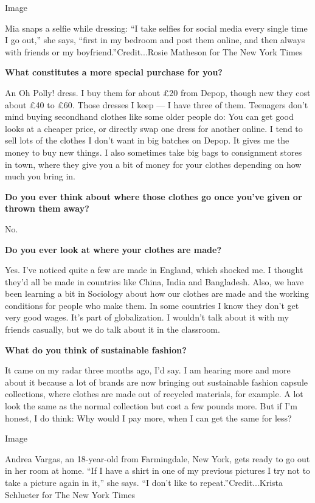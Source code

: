 Image

Mia snaps a selfie while dressing: ``I take selfies for social media
every single time I go out,'' she says, ``first in my bedroom and post
them online, and then always with friends or my
boyfriend.''Credit...Rosie Matheson for The New York Times

\textbf{What constitutes a more special purchase for you?}

An Oh Polly! dress. I buy them for about £20 from Depop, though new they
cost about £40 to £60. Those dresses I keep --- I have three of them.
Teenagers don't mind buying secondhand clothes like some older people
do: You can get good looks at a cheaper price, or directly swap one
dress for another online. I tend to sell lots of the clothes I don't
want in big batches on Depop. It gives me the money to buy new things. I
also sometimes take big bags to consignment stores in town, where they
give you a bit of money for your clothes depending on how much you bring
in.

\textbf{Do you ever think about where those clothes go once you've given
or thrown them away?}

No.

\textbf{Do you ever look at where your clothes are made?}

Yes. I've noticed quite a few are made in England, which shocked me. I
thought they'd all be made in countries like China, India and
Bangladesh. Also, we have been learning a bit in Sociology about how our
clothes are made and the working conditions for people who make them. In
some countries I know they don't get very good wages. It's part of
globalization. I wouldn't talk about it with my friends casually, but we
do talk about it in the classroom.

\textbf{What do you think of sustainable fashion?}

It came on my radar three months ago, I'd say. I am hearing more and
more about it because a lot of brands are now bringing out sustainable
fashion capsule collections, where clothes are made out of recycled
materials, for example. A lot look the same as the normal collection but
cost a few pounds more. But if I'm honest, I do think: Why would I pay
more, when I can get the same for less?

Image

Andrea Vargas, an 18-year-old from Farmingdale, New York, gets ready to
go out in her room at home. ``If I have a shirt in one of my previous
pictures I try not to take a picture again in it,'' she says. ``I don't
like to repeat.''Credit...Krista Schlueter for The New York Times

